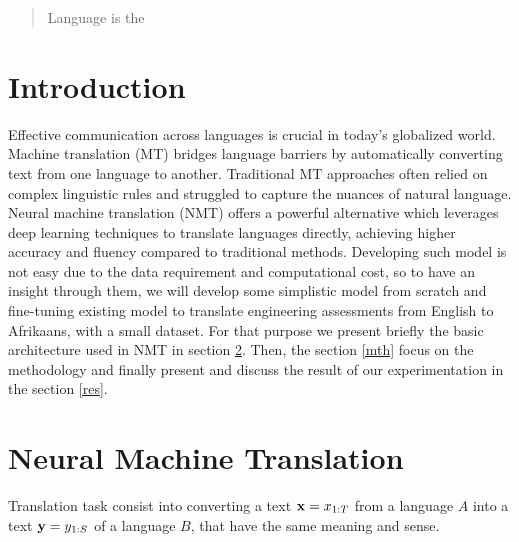 \begin{abstract}
Language is the
\end{abstract}

\section{Introduction}
Effective communication across languages is crucial in today's globalized world. Machine translation (MT) bridges language barriers by automatically converting text from one language to another. Traditional MT approaches often relied on complex linguistic rules and struggled to capture the nuances of natural language. Neural machine translation (NMT) offers a powerful alternative which leverages deep learning techniques to translate languages directly, achieving higher accuracy and fluency compared to traditional methods. Developing such model is not easy due to the data requirement and computational cost, so to have an insight through them, we will develop some simplistic model from scratch and fine-tuning existing model to translate engineering assessments from English to Afrikaans, with a small dataset. For that purpose we present briefly the basic architecture used in NMT in section \ref{nmt}.  Then, the   section \ref{mth} focus on the methodology and finally present and discuss the result of our experimentation in the section \ref{res}.

\section{Neural Machine Translation}\label{nmt}
Translation task consist into converting a text $\mathbf{x}=x_{1:T}$ from a language $A$ into a text $\mathbf{y}=y_{1:S}$ of a language $B$, that have the same meaning and sense.

